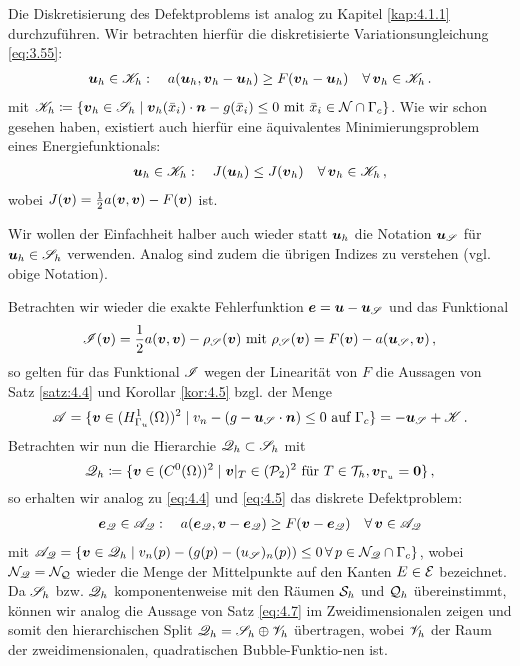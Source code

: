 Die Diskretisierung des Defektproblems ist analog zu Kapitel \ref{kap:4.1.1} durchzuführen. Wir betrachten hierfür die diskretisierte Variationsungleichung \eqref{eq:3.55}:
\begin{align}\label{eq:4.83}
	\boldsymbol u_h \in \mathscr K_h: \quad a(\boldsymbol u_h, \boldsymbol v_h - \boldsymbol u_h) \ge F(\boldsymbol v_h- \boldsymbol u_h) \quad \forall \, \boldsymbol v_h \in \mathscr K_h \, .
\end{align}
mit $\mathscr K_h \coloneqq \{  \boldsymbol v_h \in \mathscr S_h \mid \boldsymbol v_h(\bar x_i) \cdot \boldsymbol n - g(\bar x_i) \le 0 \text{ mit } \bar x_i \in \mathcal N \cap \Gamma_c\}$. Wie wir schon gesehen haben, existiert auch hierfür eine äquivalentes Minimierungsproblem eines Energiefunktionals:
\begin{align}\label{eq:4.84}
	\boldsymbol u_h \in \mathscr K_h: \quad J(\boldsymbol u_h) \le J(\boldsymbol v_h) \quad \forall \, \boldsymbol v_h \in \mathscr K_h \, ,
\end{align}
wobei $J(\boldsymbol v) = \frac 12 a(\boldsymbol v, \boldsymbol v) - F(\boldsymbol v)$ ist.

\begin{notation}
Wir wollen der Einfachheit halber auch wieder statt $\boldsymbol u_h$ die Notation $\boldsymbol u_{\mathscr S}$ für $\boldsymbol u_h \in \mathscr S_h$ verwenden. Analog sind zudem die übrigen Indizes zu verstehen (vgl.  obige Notation).
\end{notation}

Betrachten wir wieder die exakte Fehlerfunktion $\boldsymbol e = \boldsymbol u-\boldsymbol u_{\mathscr S}$ und das Funktional 
\[
	\mathscr I (\boldsymbol v) = \frac 12 a(\boldsymbol v,\boldsymbol v) - \rho_{\mathscr S} (\boldsymbol v) \text{ mit } \rho_{\mathscr S} (\boldsymbol v) = F(\boldsymbol v)-a(\boldsymbol u_{\mathscr S},\boldsymbol v) \, , 
\]
so gelten für das Funktional $\mathscr I$ wegen der Linearität von $F$ die Aussagen von Satz \ref{satz:4.4} und Korollar \ref{kor:4.5} bzgl. der Menge
\[
	\mathscr A = \{\boldsymbol v \in (H^1_{\Gamma_u}(\Omega))^2 \mid v_n - (g-\boldsymbol u_{\mathscr S}\cdot \boldsymbol n) \le 0\text{ auf } \Gamma_c\} = -\boldsymbol u_{\mathscr S} + \mathscr K \, .
\]
Betrachten wir nun die Hierarchie $\mathscr Q_h \subset \mathscr S_h$ mit
\[
	\mathscr Q_h \coloneqq \{\boldsymbol v \in (C^0(\Omega))^2 \mid \boldsymbol v|_T \in (\mathcal P_2)^2 \text{ für } T \in \mathcal T_h, \boldsymbol v_{\Gamma_u} = \boldsymbol 0\} \, ,
\]
so erhalten wir analog zu \eqref{eq:4.4} und \eqref{eq:4.5} das diskrete Defektproblem:
\begin{align}\label{eq:4.85}
	\boldsymbol e_{\mathscr Q} \in \mathscr A_{\mathscr Q} : \quad a(\boldsymbol e_{\mathscr Q}, \boldsymbol v-\boldsymbol e_{\mathscr Q}) \ge F(\boldsymbol v -\boldsymbol e_{\mathscr Q}) \quad \forall \, \boldsymbol v \in \mathscr A_{\mathscr Q}
\end{align}
mit $\mathscr A_{\mathscr Q} = \{\boldsymbol v \in \mathscr Q_h \mid v_n (p) - (g(p)-(u_{\mathscr S})_n (p)) \le 0 \, \forall \, p \in \mathcal N_{\mathscr Q}\cap \Gamma_c\}$, wobei $\mathcal N_{\mathscr Q} = \mathcal N_{\mathcal Q}$ wieder die Menge der Mittelpunkte auf den Kanten $E \in \mathcal E$ bezeichnet. Da $\mathscr S_h$ bzw. $\mathscr Q_h$ komponentenweise mit den Räumen $\mathcal S_h$ und $\mathcal Q_h$ übereinstimmt, können wir analog die Aussage von Satz \ref{eq:4.7} im Zweidimensionalen zeigen und somit den hierarchischen Split $\mathscr Q_h = \mathscr S_h \oplus \mathscr V_h$ übertragen, wobei $\mathscr V_h$ der Raum der zweidimensionalen, quadratischen  Bubble-Funktio-nen ist.

